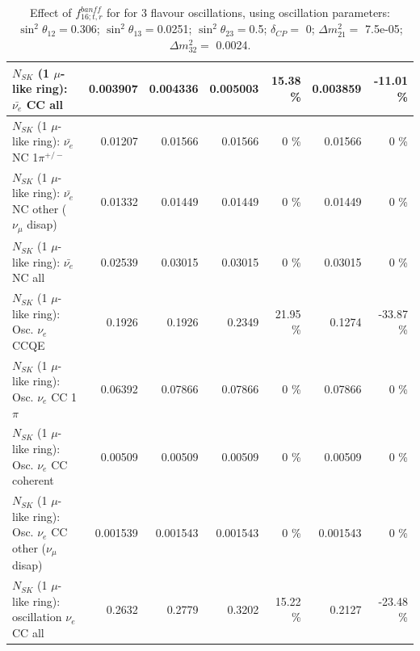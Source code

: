 \begin{table}
\begin{tabular}{| l | r | r | r  r | r  r |}
                            $N_{SK}$ (1 $\mu$-like ring): $\bar{\nu_{e}}$ CC all &        0.003907 &        0.004336 &        0.005003 &    15.38 \%  &        0.003859 &   -11.01 \%  \\ 
\hline
                     $N_{SK}$ (1 $\mu$-like ring): $\bar{\nu_e}$ NC 1$\pi^{+/-}$ &         0.01207 &         0.01566 &         0.01566 &        0 \%  &         0.01566 &        0 \%  \\ 
          $N_{SK}$ (1 $\mu$-like ring): $\bar{\nu_e}$ NC other ($\nu_\mu$ disap) &         0.01332 &         0.01449 &         0.01449 &        0 \%  &         0.01449 &        0 \%  \\ 
                            $N_{SK}$ (1 $\mu$-like ring): $\bar{\nu_{e}}$ NC all &         0.02539 &         0.03015 &         0.03015 &        0 \%  &         0.03015 &        0 \%  \\ 
\hline
\hline
\hline
                                 $N_{SK}$ (1 $\mu$-like ring): Osc. $\nu_e$ CCQE &          0.1926 &          0.1926 &          0.2349 &    21.95 \%  &          0.1274 &   -33.87 \%  \\ 
                            $N_{SK}$ (1 $\mu$-like ring): Osc. $\nu_e$ CC 1$\pi$ &         0.06392 &         0.07866 &         0.07866 &        0 \%  &         0.07866 &        0 \%  \\ 
                          $N_{SK}$ (1 $\mu$-like ring): Osc. $\nu_e$ CC coherent &         0.00509 &         0.00509 &         0.00509 &        0 \%  &         0.00509 &        0 \%  \\ 
           $N_{SK}$ (1 $\mu$-like ring): Osc. $\nu_e$ CC other ($\nu_\mu$ disap) &        0.001539 &        0.001543 &        0.001543 &        0 \%  &        0.001543 &        0 \%  \\ 
                        $N_{SK}$ (1 $\mu$-like ring): oscillation $\nu_e$ CC all &          0.2632 &          0.2779 &          0.3202 &    15.22 \%  &          0.2127 &   -23.48 \%  \\ 
\hline
\hline
\end{tabular}
\caption{ Effect of $f_{16; t, r}^{banff}$ for for 3 flavour oscillations, using oscillation parameters:  $\sin^2\theta_{12} = $0.306; $\sin^2\theta_{13} = $0.0251; $\sin^2\theta_{23} = $0.5; $\delta_{CP} = $        0; $\Delta m^2_{21} = $    7.5e-05; $\Delta m^2_{32} = $    0.0024. }
\label{tab:num_banff_maqe_1RmuT_3f_osc_t13:0.0251}
\end{table}
\clearpage
